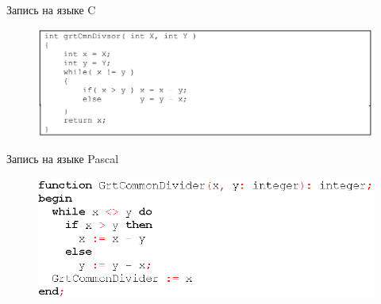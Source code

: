 \documentclass{beamer}
\begin{document}
\begin{frame}
\begin{block}{Запись на языке C}
\begin{figure}[h]
\centering
\includegraphics[scale=0.35]{images/lec01-pic06.png}
\end{figure}
\end{block}
\begin{block}{Запись на языке Pascal}
\begin{figure}[h]
\centering
\includegraphics[scale=0.35]{images/lec01-pic07.png}
\end{figure}
\end{block}
\end{frame}
\end{document}
